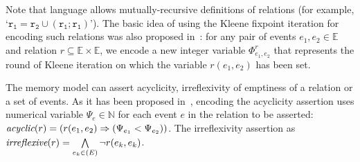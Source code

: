 Note that \cat{} language allows mutually-recursive definitions of relations (for example, `$\texttt{r}_\texttt{1} = \texttt{r}_\texttt{2} \cup (\texttt{r}_\texttt{1}; \texttt{r}_\texttt{1})$').
The basic idea of using the Kleene fixpoint iteration for encoding such relations was also proposed in~\cite{Porthos17a}: for any pair of events $e_1,e_2 \in \mathbb{E}$ and relation $r \subseteq \mathbb{E} \times \mathbb{E}$, we encode a new integer variable $\Phi_{e_1,e_2}^{r}$ that represents the round of Kleene iteration on which the variable $r(e_1, e_2)$ has been set.

The memory model can assert acyclicity, irreflexivity of emptiness of a relation or a set of events.
As it has been proposed in~\cite{Porthos17a}, encoding the acyclicity assertion uses numerical variable $\Psi_e \in \mathbb{N}$ for each event $e$ in the relation to be asserted: $\textit{acyclic}(r) = (r(e_1,e_2) \Rightarrow (\Psi_{e_1} < \Psi_{e_2}))$.
The irreflexivity assertion as $\textit{irreflexive}(r) = \bigwedge\limits_{e_k \in \mathbb(E)}^{} \lnot r(e_k,e_k)$.




%
